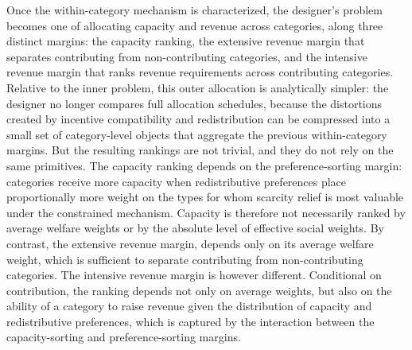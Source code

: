 \documentclass{class}
\begin{document}
Once the within-category mechanism is characterized, the designer’s problem becomes one of allocating capacity and revenue across categories, along three distinct margins: the capacity ranking, the extensive revenue margin that separates contributing from non-contributing categories, and the intensive revenue margin that ranks revenue requirements across contributing categories. Relative to the inner problem, this outer allocation is analytically simpler: the designer no longer compares full allocation schedules, because the distortions created by incentive compatibility and redistribution can be compressed into a small set of category-level objects that aggregate the previous within-category margins. But the resulting rankings are not trivial, and they do not rely on the same primitives. The capacity ranking depends on the preference-sorting margin: categories receive more capacity when redistributive preferences place proportionally more weight on the types for whom scarcity relief is most valuable under the constrained mechanism. Capacity is therefore not necessarily ranked by average welfare weights or by the absolute level of effective social weights. By contrast, the extensive revenue margin, depends only on its average welfare weight, which is sufficient to separate contributing from non-contributing categories. The intensive revenue margin is however different. Conditional on contribution, the ranking depends not only on average weights, but also on the ability of a category to raise revenue given the distribution of capacity and redistributive preferences, which is captured by the interaction between the capacity-sorting and preference-sorting margins.
\end{document}
